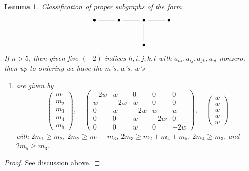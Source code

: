\documentclass{stacks-project}
\theoremstyle{plain}
\newtheorem{lemma}[subsection]{Lemma}
\theoremstyle{definition}
\theoremstyle{remark}
\numberwithin{equation}{subsection}
\begin{document}
\begin{lemma}
\label{lemma-D5}
Classification of proper subgraphs of the form
$$
\xymatrix{
\bullet \ar@{-}[r] & \bullet \ar@{-}[r] &
\bullet \ar@{-}[r] \ar@{-}[d] & \bullet \\
& & \bullet
}
$$
If $n > 5$, then given five $(-2)$-indices $h, i, j, k, l$
with $a_{hi}, a_{ij}, a_{jk}, a_{jl}$ nonzero, then up
to ordering we have the $m$'s, $a$'s, $w$'s
\begin{enumerate}
\item
\label{item-D5}
are given by
$$
\left(
\begin{matrix}
m_1 \\
m_2 \\
m_3 \\
m_4 \\
m_5
\end{matrix}
\right),
\quad
\left(
\begin{matrix}
-2w & w & 0 & 0 & 0 \\
w & -2w & w & 0 & 0 \\
0 & w & -2w & w & w \\
0 & 0 & w & -2w & 0 \\
0 & 0 & w & 0 & -2w
\end{matrix}
\right),
\quad
\left(
\begin{matrix}
w \\
w \\
w \\
w \\
w
\end{matrix}
\right)
$$
with $2m_1 \geq m_2$, $2m_2 \geq m_1 + m_3$, $2m_3 \geq m_2 + m_4 + m_5$,
$2m_4 \geq m_3$, and $2m_5 \geq m_3$.
\end{enumerate}
\end{lemma}

\begin{proof}
See discussion above.
\end{proof}
\end{document}
